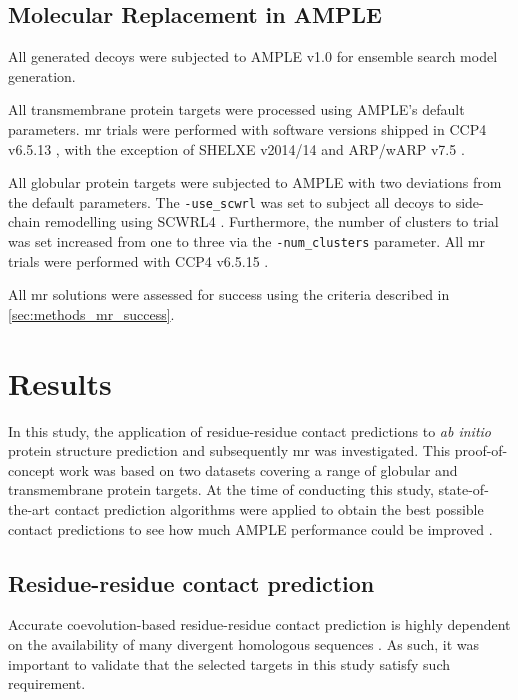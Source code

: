 \subsection{Molecular Replacement in AMPLE}
All generated decoys were subjected to AMPLE v1.0 \cite{Bibby2012-lm} for ensemble search model generation. 

All transmembrane protein targets were processed using AMPLE's default parameters. \Gls{mr} trials were performed with software versions shipped in CCP4 v6.5.13 \cite{Winn2011-xe}, with the exception of SHELXE v2014/14 \cite{Thorn2013-le} and ARP/wARP v7.5 \cite{Cohen2008-wg}.

All globular protein targets were subjected to AMPLE with two deviations from the default parameters. The \texttt{-use\_scwrl} was set to subject all decoys to side-chain remodelling using SCWRL4 \cite{Krivov2009-ex}. Furthermore, the number of clusters to trial was set increased from one to three via the \texttt{-num\_clusters} parameter. All \gls{mr} trials were performed with CCP4 v6.5.15 \cite{Winn2011-xe}.

All \gls{mr} solutions were assessed for success using the criteria described in \cref{sec:methods_mr_success}.

\section{Results}
In this study, the application of residue-residue contact predictions to \textit{ab initio} protein structure prediction and subsequently \gls{mr} was investigated. This proof-of-concept work was based on two datasets covering a range of globular and transmembrane protein targets. At the time of conducting this study, state-of-the-art contact prediction algorithms were applied to obtain the best possible contact predictions to see how much AMPLE performance could be improved \cite{Bibby2012-lm}.

\subsection{Residue-residue contact prediction} \label{subsec:ample_proof_conpred}
Accurate coevolution-based residue-residue contact prediction is highly dependent on the availability of many divergent homologous sequences \cite{Simkovic2017-xs}. As such, it was important to validate that the selected targets in this study satisfy such requirement.

